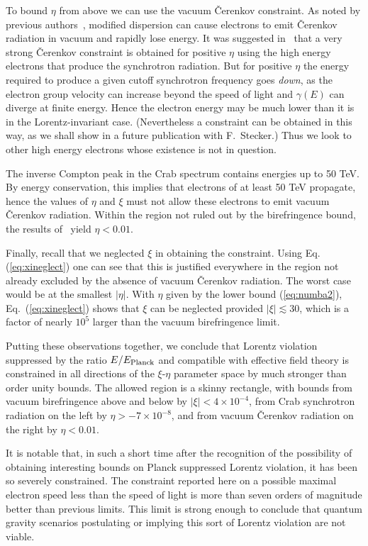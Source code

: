 \documentclass[12pt]{article}
\begin{document}
To bound $\eta$ from above we can use the vacuum
\v{C}erenkov constraint. As noted by previous
authors~\cite{Gonzalez-Mestres:1995jg,CG,Jacobson:2001tu,Konopka:2002tt},
modified dispersion can cause electrons to emit
\v{C}erenkov radiation in vacuum and rapidly lose
energy. It was suggested in~\cite{Stecker:2003ni} that a
very strong \v{C}erenkov constraint is obtained for
positive $\eta$ using the high energy electrons that
produce the synchrotron radiation. But for positive
$\eta$ the energy required to produce a given cutoff
synchrotron frequency goes {\it down}, as the electron
group velocity can increase beyond the speed of light and
$\gamma(E)$ can diverge at finite energy.  Hence the
electron energy may be much lower than it is in the
Lorentz-invariant case. (Nevertheless a constraint can be
obtained in this way, as we shall show in a future
publication with F.~Stecker.) Thus we look to other high
energy electrons whose existence is not in question.

The inverse Compton peak in the Crab spectrum contains
energies up to 50 TeV.  By energy conservation, this
implies that electrons of at least 50 TeV propagate,
hence the values of $\eta$ and $\xi$ must not allow these
electrons to emit vacuum \v{C}erenkov radiation. Within
the region not ruled out by the birefringence bound, the
results of~\cite{Jacobson:2001tu,JLM02,Konopka:2002tt}
yield $\eta<0.01$.

Finally, recall that we neglected $\xi$ in obtaining the
constraint. Using Eq. (\ref{eq:xineglect}) one can see that this
is justified everywhere in the region not already excluded by the
absence of vacuum \v{C}erenkov radiation. The worst case would be
at the smallest $|\eta|$. With $\eta$ given by the lower bound
(\ref{eq:numba2}), Eq.~(\ref{eq:xineglect}) shows that $\xi$ can
be neglected provided $|\xi|\lesssim 30$, which is a factor of
nearly $10^5$ larger than the vacuum birefringence limit.

Putting these observations together, we conclude that Lorentz
violation suppressed by the ratio $E/E_{\rm Planck}$ and
compatible with effective field theory is constrained in all
directions of the $\xi$-$\eta$ parameter space by much stronger
than order unity bounds. The allowed region is a skinny rectangle,
with bounds from vacuum birefringence above and below by $|\xi|<
4\times 10^{-4}$, from Crab synchrotron radiation on the left by
$\eta>- 7\times 10^{-8}$, and from vacuum \v{C}erenkov radiation
on the right by $\eta<0.01$.

It is notable that, in such a short time after the
recognition of the possibility of obtaining interesting
bounds on Planck suppressed Lorentz violation, it has
been so severely constrained. The constraint reported
here on a possible maximal electron speed less than the
speed of light is more than seven orders of magnitude
better than previous limits.  This limit is strong enough
to conclude that quantum gravity scenarios postulating or
implying this sort of Lorentz violation are not viable.
\end{document}
